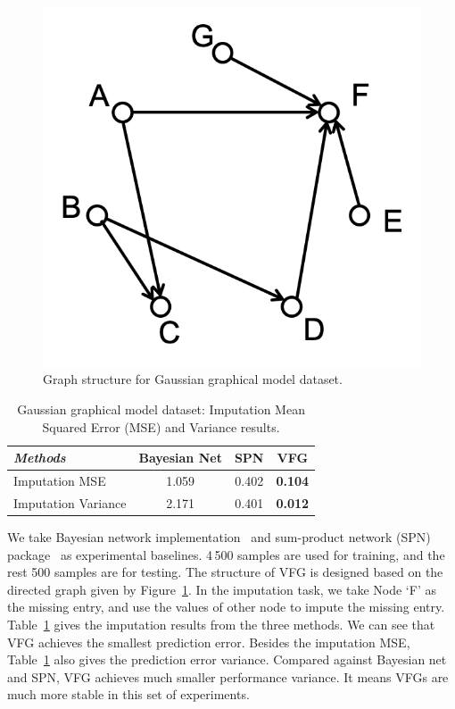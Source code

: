 \documentclass[sigconf, anonymous, review]{acmart}
\theoremstyle{plain}
\theoremstyle{definition}
\theoremstyle{remark}
\begin{document}
\begin{figure}
\vspace{-0.15in}
\begin{center}
 \includegraphics[width=1\linewidth]{fig/gaussian_graph.png}
\end{center}
\vspace{-0.1in}
\caption{Graph structure for Gaussian graphical model dataset. }
\label{fig:gaussian_graph}
\vspace{-0.1in}
\end{figure}
\begin{table}[H]
\centering
\caption{Gaussian graphical model dataset: Imputation Mean Squared Error (MSE) and Variance results.\vspace{-0.1in}} \label{tab:gaussian}
 \begin{tabular}{l | c | c | c  }\hline
\textit{Methods} & Bayesian Net & SPN & VFG \\
\hline
Imputation MSE &  1.059 & 0.402 &  \textbf{0.104} \\
Imputation Variance  & 2.171  &   0.401 &  \textbf{0.012} \\
\hline
\end{tabular}
\end{table}


We take  Bayesian network implementation~\cite{bnlearn}  and sum-product network (SPN) package~\cite{SPFlow,poon2011sum} as  experimental baselines.  4\,500 samples are used for training, and the rest 500 samples  are for testing. The structure of VFG is designed based on  the directed graph given by Figure~\ref{fig:gaussian_graph}. In the imputation task, we take Node `F' as the missing entry, and use the values of other node to impute the missing entry.  Table~\ref{tab:gaussian} gives the imputation results from the three methods.  We can see that VFG achieves the smallest prediction error. Besides the imputation MSE,  Table~\ref{tab:gaussian} also gives the prediction error variance. Compared against  Bayesian net  and SPN, VFG achieves much smaller performance variance. It means VFGs are much more stable in this set of experiments. 
\end{document}
